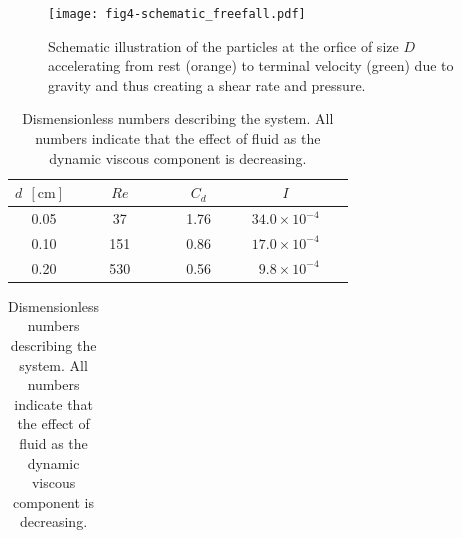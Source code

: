 \documentclass[twoside,twocolumn,9pt]{article}
\begin{document}
%
\begin{figure}[!t]
\centering
\texttt{[image: fig4-schematic\_freefall.pdf]}\\
 
\caption{Schematic illustration of the particles at the orfice of size $D$ accelerating from rest (orange) to terminal velocity (green) due to gravity and thus creating a shear rate and pressure.
\label{fig:freefall}}
\end{figure}


\begin{table}[!b]
\caption{Dismensionless numbers describing the system. All numbers 
indicate that the effect of fluid as the dynamic viscous component is 
decreasing.}\label{tab:dimensionless}
\setlength{\extrarowheight}{2pt}
  \begin{tabular*}{0.5\textwidth}{@{\extracolsep{\fill}}cccrr}
    \hline
$d~~\mathrm{[cm]}$~	& ~~~$Re$~~~ 	& ~~~$C_d$~~~	&\multicolumn{1}{c}{~$I$~ }\\[2pt]
\hline
0.05				& 37						& 1.76		&~$34.0 \times 10^{-4}$~\\
0.10				& 151						& 0.86		&~$17.0 \times 10^{-4}$~\\
0.20				& 530						& 0.56  	&~$ 9.8 \times 10^{-4}$~\\   \hline
  \end{tabular*}

\begin{tabular}{cccrr}

\end{tabular}
\end{table}

 
 
 
\end{document}
